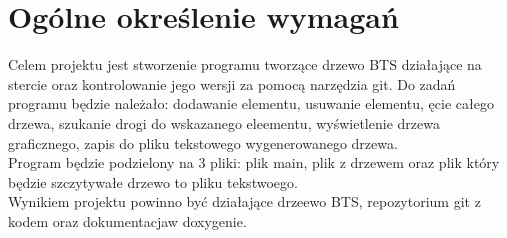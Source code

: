 	\newpage
\section{Ogólne określenie wymagań}		%

\hspace{0.60cm}

Celem projektu jest stworzenie programu tworzące drzewo BTS działające na stercie oraz kontrolowanie jego wersji za pomocą narzędzia git. Do zadań programu będzie należało: dodawanie elementu, usuwanie elementu, ęcie całego drzewa, szukanie drogi do wskazanego eleementu, wyświetlenie drzewa graficznego, zapis do pliku tekstowego wygenerowanego drzewa. 
\\
Program będzie podzielony na 3 pliki: plik main, plik z drzewem oraz plik który będzie szczytywałe drzewo to pliku tekstwoego.
\\
Wynikiem projektu powinno być działające drzeewo BTS, repozytorium git z kodem oraz dokumentacjaw doxygenie.

